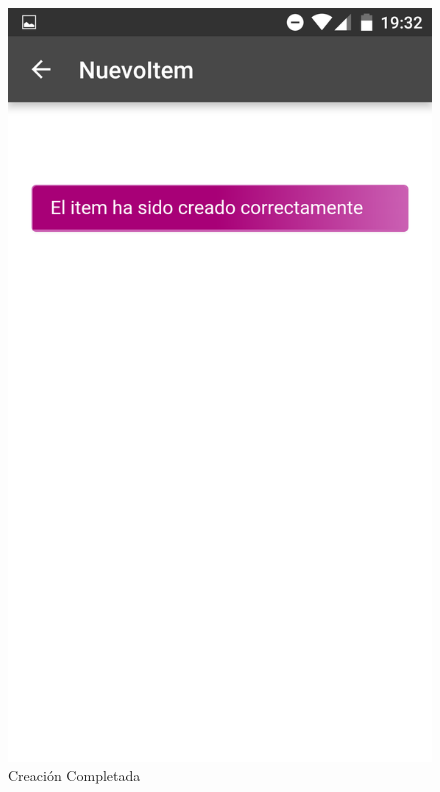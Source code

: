 \documentclass[a4paper,11pt]{book}
\begin{document}
\begin{figure}[H]
  \includegraphics[width=\linewidth]{imagenes/pruebas/movil/movil4.png}
  \caption{Creación Completada\cite{propio}}
\endminipage\hfill
\end{figure}
\end{document}
